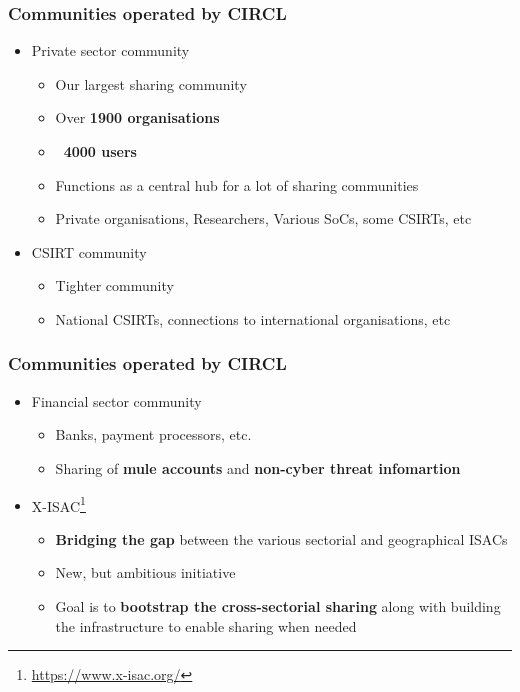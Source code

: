 \begin{frame}
\frametitle{Communities operated by CIRCL}
\begin{itemize}
        \item Private sector community
	\begin{itemize}
		\item Our largest sharing community
		\item Over {\bf 1900 organisations}
		\item {\bf ~4000 users}
		\item Functions as a central hub for a lot of sharing communities
		\item Private organisations, Researchers, Various SoCs, some CSIRTs, etc
	\end{itemize}
	\item CSIRT community
	\begin{itemize}
		\item Tighter community
		\item National CSIRTs, connections to international organisations, etc
	\end{itemize}
\end{itemize}
\end{frame}

\begin{frame}
\frametitle{Communities operated by CIRCL}
\begin{itemize}
	\item Financial sector community
	\begin{itemize}
		\item Banks, payment processors, etc.
		\item Sharing of {\bf mule accounts} and {\bf non-cyber threat infomartion}
	\end{itemize}
    \item X-ISAC\footnote{\url{https://www.x-isac.org/}}
	\begin{itemize}
		\item {\bf Bridging the gap} between the various sectorial and geographical ISACs
		\item New, but ambitious initiative
		\item Goal is to {\bf bootstrap the cross-sectorial sharing} along with building the infrastructure to enable sharing when needed
	\end{itemize}
\end{itemize}
\end{frame}

